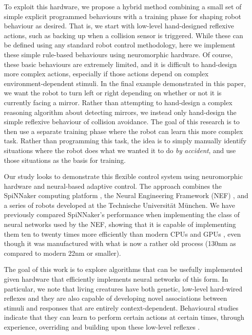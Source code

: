\documentclass{frontiersSCNS}
\begin{document}
To exploit this hardware, we propose a hybrid method combining a small set of
simple explicit programmed behaviours with a training phase for shaping robot
behaviour as desired.  That is, we start with low-level hand-designed reflexive
actions, such as backing up when a collision sensor is triggered.  While these can be defined using
any standard robot control methodology, here we implement these simple rule-based
behaviours using neuromorphic hardware.  Of course, these basic behaviours
are extremely limited, and it is difficult to hand-design more complex actions,
especially if those actions depend on complex environment-dependent stimuli.
In the final example demonstrated in this paper, we want the robot to turn
left or right depending on whether or not it is currently facing a mirror.
Rather than attempting to hand-design a complex reasoning algorithm about detecting
mirrors, we instead only hand-design the simple reflexive behaviour of collision
avoidance.  The goal of this research is to then use a separate training phase
where the robot can learn this more complex task.  Rather than programming this
task, the idea is to simply manually identify situations where the robot
does what we wanted it to do \textit{by accident}, and use those situations as
the basis for training.

Our study looks to demonstrate this flexible control system using 
neuromorphic hardware and neural-based adaptive control. The approach 
combines the SpiNNaker computing 
platform \citep{furber2007neural, furber2014spinnaker}, the Neural Engineering 
Framework (NEF)  \citep{eliasmith2004neural}, and a series of robots developed at 
the Technische Universit{\"a}t M{\"u}nchen.  We have previously compared
SpiNNaker's performance when implementing the class of neural networks used by
the NEF, showing that it is capable of implementing them ten to twenty times more efficiently
than modern CPUs and GPUs \citep{closedloop2015}, even though it was manufactured
with what is now a rather old process (130nm as compared to modern 22nm or smaller).

The goal of this work is to explore algorithms that can be usefully implemented
given hardware that efficiently implements neural networks of this form.  In
particular, we note that living creatures have both genetic, low-level 
hard-wired reflexes and they are also capable of developing novel associations 
between stimuli and responses that are entirely context-dependent. Behavioural 
studies indicate that they can learn to perform certain actions at certain 
times, through experience, overriding and building upon these low-level 
reflexes \citep{kim2007encoding}. 
\end{document}

